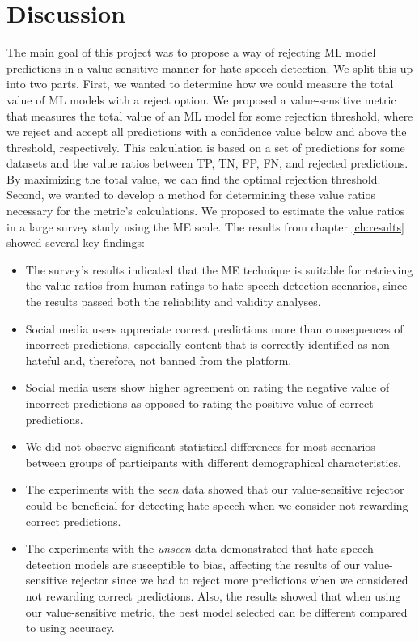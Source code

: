 \chapter{Discussion}
The main goal of this project was to propose a way of rejecting ML model predictions in a value-sensitive manner for hate speech detection.
%
We split this up into two parts.
%
First, we wanted to determine how we could measure the total value of ML models with a reject option.
%
We proposed a value-sensitive metric that measures the total value of an ML model for some rejection threshold, where we reject and accept all predictions with a confidence value below and above the threshold, respectively.
%
This calculation is based on a set of predictions for some datasets and the value ratios between TP, TN, FP, FN, and rejected predictions.
%
By maximizing the total value, we can find the optimal rejection threshold.
%
Second, we wanted to develop a method for determining these value ratios necessary for the metric's calculations.
%
We proposed to estimate the value ratios in a large survey study using the ME scale.
%
The results from chapter \ref{ch:results} showed several key findings:
\begin{itemize}
    \item The survey's results indicated that the ME technique is suitable for retrieving the value ratios from human ratings to hate speech detection scenarios, since the results passed both the reliability and validity analyses.
    \item Social media users appreciate correct predictions more than consequences of incorrect predictions, especially content that is correctly identified as non-hateful and, therefore, not banned from the platform.
    \item Social media users show higher agreement on rating the negative value of incorrect predictions as opposed to rating the positive value of correct predictions.
    \item We did not observe significant statistical differences for most scenarios between groups of participants with different demographical characteristics.
    \item The experiments with the \emph{seen} data showed that our value-sensitive rejector could be beneficial for detecting hate speech when we consider not rewarding correct predictions.
    \item The experiments with the \emph{unseen} data demonstrated that hate speech detection models are susceptible to bias, affecting the results of our value-sensitive rejector since we had to reject more predictions when we considered not rewarding correct predictions. Also, the results showed that when using our value-sensitive metric, the best model selected can be different compared to using accuracy.
\end{itemize}
%


